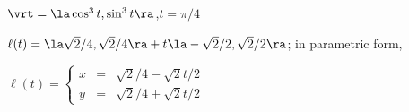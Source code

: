 {$\vrt = \la \cos^3 t,\sin^3t \ra$,\quad $t=\pi/4$
}
{$\ell(t) = \la \sqrt{2}/4,\sqrt{2}/4\ra + t\la -\sqrt{2}/2,\sqrt{2}/2\ra$; in parametric form,

$\ell(t) = \left\{\begin{array}{ccc} x&=&\sqrt{2}/4-\sqrt{2}t/2 \\ y &=& \sqrt{2}/4+\sqrt{2}t/2\end{array}\right.$
}